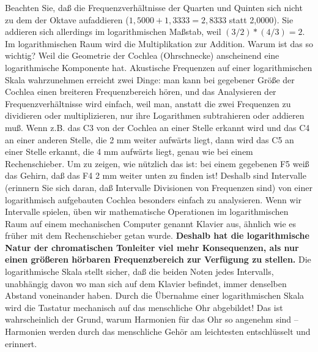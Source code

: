 Beachten Sie, daß die Frequenzverhältnisse der Quarten und Quinten sich nicht zu dem der Oktave aufaddieren ($1,5000 + 1,3333 = 2,8333$ statt 2,0000).
Sie addieren sich allerdings im logarithmischen Maßstab, weil $(3/2)*(4/3) = 2$.
Im logarithmischen Raum wird die Multiplikation zur Addition.
Warum ist das so wichtig?
Weil die Geometrie der Cochlea (Ohrschnecke) anscheinend eine logarithmische Komponente hat.
Akustische Frequenzen auf einer logarithmischen Skala wahrzunehmen erreicht zwei Dinge: man kann bei gegebener Größe der Cochlea einen breiteren Frequenzbereich hören, und das Analysieren der Frequenzverhältnisse wird einfach, weil man, anstatt die zwei Frequenzen zu dividieren oder multiplizieren, nur ihre Logarithmen subtrahieren oder addieren muß.
Wenn z.B. das C3 von der Cochlea an einer Stelle erkannt wird und das C4 an einer anderen Stelle, die 2 mm weiter aufwärts liegt, dann wird das C5 an einer Stelle erkannt, die 4 mm aufwärts liegt, genau wie bei einem Rechenschieber.
Um zu zeigen, wie nützlich das ist: bei einem gegebenen F5 weiß das Gehirn, daß das F4 2 mm weiter unten zu finden ist!
Deshalb sind Intervalle (erinnern Sie sich daran, daß Intervalle Divisionen von Frequenzen sind) von einer logarithmisch aufgebauten Cochlea besonders einfach zu analysieren.
Wenn wir Intervalle spielen, üben wir mathematische Operationen im logarithmischen Raum auf einem mechanischen Computer genannt Klavier aus, ähnlich wie es früher mit dem Rechenschieber getan wurde.
\textbf{Deshalb hat die logarithmische Natur der chromatischen Tonleiter viel mehr Konsequenzen, als nur einen größeren hörbaren Frequenzbereich zur Verfügung zu stellen.}
Die logarithmische Skala stellt sicher, daß die beiden Noten jedes Intervalls, unabhängig davon wo man sich auf dem Klavier befindet, immer denselben Abstand voneinander haben.
Durch die Übernahme einer logarithmischen Skala wird die Tastatur mechanisch auf das menschliche Ohr abgebildet!
Das ist wahrscheinlich der Grund, warum Harmonien für das Ohr so angenehm sind -- Harmonien werden durch das menschliche Gehör am leichtesten entschlüsselt und erinnert.

